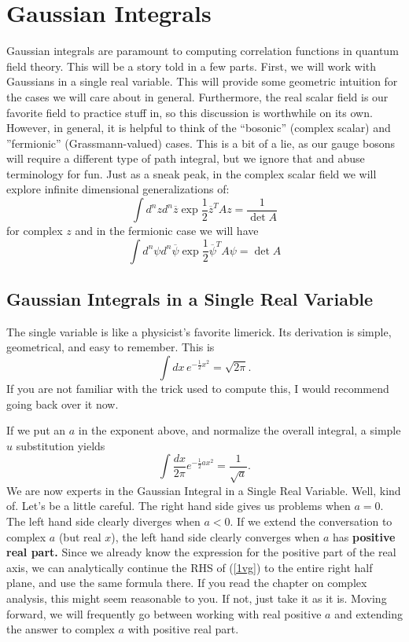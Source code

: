 \documentclass{book}
\begin{document}
\chapter{Gaussian Integrals}

Gaussian integrals are paramount to computing correlation functions in quantum field theory. This will be a story told in a few parts. First, we will work with Gaussians in a single real variable. This will provide some geometric intuition for the cases we will care about in general. Furthermore, the real scalar field is our favorite field to practice stuff in, so this discussion is worthwhile on its own. However, in general, it is helpful to think of the ``bosonic'' (complex scalar) and ''fermionic'' (Grassmann-valued) cases. This is a bit of a lie, as our gauge bosons will require a different type of path integral, but we ignore that and abuse terminology for fun. Just as a sneak peak, in the complex scalar field we will explore infinite dimensional generalizations of:
\[
\int d^n z d^n \overline{z} \exp{\frac{1}{2} \overline{z}^T A z } = \frac{1}{\det A}
\]
for complex $z$ and in the fermionic case we will have
\[
\int d^n \psi d^n \overline{\psi} \exp{\frac{1}{2} \overline{\psi}^T A \psi} = \det A
\]

\section{Gaussian Integrals in a Single Real Variable}

The single variable is like a physicist's favorite limerick. Its derivation is simple, geometrical, and easy to remember. This is
\[
\int dx \, e^{-\frac{1}{2} x^2} = \sqrt{2 \pi}.
\]
If you are not familiar with the trick used to compute this, I would recommend going back over it now.

If we put an $a$ in the exponent above, and normalize the overall integral, a simple $u$ substitution yields
\begin{equation} \label{1vg}
\boxed{\int \frac{dx}{2\pi} e^{-\frac{1}{2} ax^2} = \frac{1}{\sqrt{a}}.}
\end{equation}
We are now experts in the Gaussian Integral in a Single Real Variable. Well, kind of. Let's be a little careful. The right hand side gives us problems when $a = 0$. The left hand side clearly diverges when $a < 0$. If we extend the conversation to complex $a$ (but real $x$), the left hand side clearly converges when $a$ has \textbf{positive real part.} Since we already know the expression for the positive part of the real axis, we can analytically continue the RHS of (\ref{1vg}) to the entire right half plane, and use the same formula there. If you read the chapter on complex analysis, this might seem reasonable to you. If not, just take it as it is. Moving forward, we will frequently go between working with real positive $a$ and extending the answer to complex $a$ with positive real part.
\end{document}
